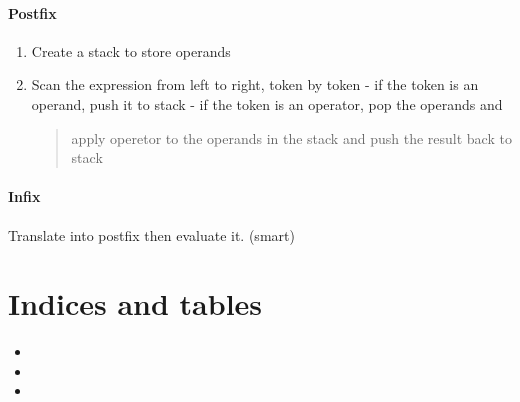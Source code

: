 \documentclass[letterpaper,10pt,english]{sphinxmanual}
\begin{document}
\subsubsection{Postfix}
\label{topics/evaluation:id1}\begin{enumerate}
\item {} 
Create a stack to store operands

\item {} 
Scan the expression from left to right, token by token
- if the token is an operand, push it to stack
- if the token is an operator, pop the operands and
\begin{quote}

apply operetor to the operands in the stack and
push the result back to stack
\end{quote}

\end{enumerate}


\subsubsection{Infix}
\label{topics/evaluation:id2}
Translate into postfix then evaluate it. (smart)


\chapter{Indices and tables}
\label{index:indices-and-tables}\begin{itemize}
\item {} 

\item {} 

\item {} 

\end{itemize}



\renewcommand{\indexname}{Index}
\printindex
\end{document}
